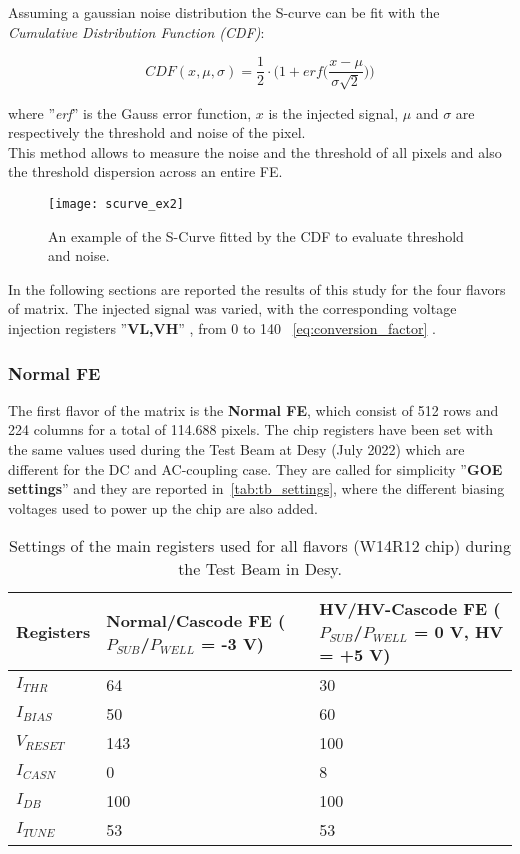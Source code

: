 Assuming a gaussian noise distribution the S-curve can be fit with the \textit{Cumulative Distribution Function (CDF)}:

\begin{equation}
 CDF(x,\mu,\sigma) = \frac{1}{2} \cdot \bigg(1 + \textit{erf}\bigg(\frac{x-\mu}{\sigma \sqrt{2}}\bigg)\bigg)
\end{equation}

where ''\textit{erf}'' is the Gauss error function, $x$ is the injected signal, $\mu$ and $\sigma$ are respectively the threshold and noise of the pixel.  \\

This method allows to measure the noise and the threshold of all pixels and also the threshold dispersion across an entire FE.

\begin{figure}
\centering
\texttt{[image: scurve\_ex2]}
\caption{An example of the S-Curve fitted by the CDF to evaluate threshold and noise.}
\label{fig:ex_scurve}
\end{figure}

In the following sections are reported the results of this study for the four flavors of matrix. The injected signal was varied, with the corresponding voltage injection registers ''\textbf{VL,VH}'' , from 0 to 140 ~\autoref{eq:conversion_factor} .



\subsubsection{Normal FE}

The first flavor of the matrix is the \textbf{Normal FE}, which consist of 512 rows and 224 columns for a total of 114.688 pixels. The chip registers have been set with the same values used during the Test Beam at Desy (July 2022) which are different for the DC and AC-coupling case. They are called for simplicity ''\textbf{GOE settings}'' and they are reported in~\autoref{tab:tb_settings}, where the different biasing voltages used to power up the chip are also added.

\begin{table}[h!]
\centering
\begin{tabular}{>{} C{3.2cm}|C{3.7cm}|C{3.5cm}}
Registers & Normal/Cascode FE ($P_{SUB}$/$P_{WELL}$ = -3 V) & HV/HV-Cascode FE ($P_{SUB}$/$P_{WELL}$ = 0 V, HV = +5 V)\\[2ex]
\hline
$I_{THR}$ & 64 & 30\\[0.5ex]
\hline
$I_{BIAS}$ & 50 & 60\\
\hline
$V_{RESET}$ & 143 & 100\\
\hline
$I_{CASN}$ & 0 & 8\\
\hline
$I_{DB}$ & 100 & 100\\
\hline
$I_{TUNE}$ & 53 & 53\\
\hline
\end{tabular}
\caption{Settings of the main registers used for all flavors (W14R12 chip) during the Test Beam in Desy.}
\label{tab:tb_settings}
\end{table}


